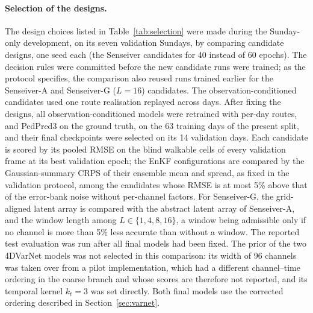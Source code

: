 \documentclass[english, 12pt, a4paper, elec, utf8, a-2b, online]{aaltothesis}
\begin{document}
\paragraph{Selection of the designs.}
The design choices listed in Table~\ref{tab:selection} were made during the
Sunday-only development, on its seven validation Sundays, by comparing
candidate designs, one seed each (the Senseiver
candidates for 40 instead of 60 epochs). The decision rules were committed
before the new candidate runs were trained; as the protocol specifies, the
comparison also reused runs trained earlier for the Senseiver\nobreakdash-A and
Senseiver\nobreakdash-G ($L = 16$) candidates.
The observation-conditioned candidates used one route realisation
replayed across days. After fixing the designs, all observation-conditioned
models were retrained with per-day routes, and PedPred3 on the ground truth,
on the 63 training days of the present split, and their final checkpoints
were selected on its 14 validation days. Each candidate is scored by its
pooled RMSE on the blind walkable cells of every validation frame at its best
validation epoch; the EnKF configurations are compared by the
Gaussian-summary CRPS of their ensemble mean and spread, as fixed in the
validation protocol, among the candidates whose RMSE is at most 5\% above that
of the error-bank noise without per-channel factors. For Senseiver\nobreakdash-G,
the grid-aligned latent array is compared with the abstract latent array of
Senseiver\nobreakdash-A, and the window length among $L \in \{1, 4, 8, 16\}$, a window
being admissible only if no channel is more than 5\% less accurate than without
a window. The
reported test evaluation was run after all final models had been fixed.
The prior of the two 4DVarNet models was not selected in this comparison: its
width of 96 channels was taken over from a pilot implementation, which had a
different channel--time ordering in the coarse branch and whose scores are
therefore not reported, and its temporal kernel $k_t = 3$ was set directly.
Both final models use the corrected ordering described in
Section~\ref{sec:varnet}.
\end{document}
